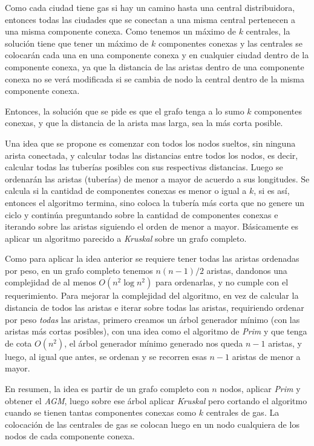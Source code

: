 Como cada ciudad tiene gas si hay un camino hasta una central distribuidora, entonces todas las ciudades que se conectan
a una misma central pertenecen a una misma componente conexa. Como tenemos un m\'aximo de $k$ centrales, la soluci\'on tiene que tener un m\'aximo de $k$ componentes conexas y las centrales se colocar\'an cada una en una componente conexa y en cualquier ciudad dentro de la componente conexa, ya que la distancia de las aristas dentro de una componente conexa no se ver\'a modificada si se cambia de nodo la central dentro de la misma componente conexa.

Entonces, la soluci\'on que se pide es que el grafo tenga a lo sumo $k$ componentes conexas, y que la distancia de la arista mas larga, sea la m\'as corta posible.

Una idea que se propone es comenzar con todos los nodos sueltos, sin ninguna arista conectada,
y calcular todas las distancias entre todos los nodos, es decir, calcular todas las tuber\'ias posibles con sus respectivas distancias.
Luego se ordenar\'an las aristas (tuber\'ias) de menor a mayor de acuerdo a sus longitudes.
Se calcula si la cantidad de componentes conexas es menor o igual a $k$, si es as\'i, entonces el algoritmo termina, sino coloca la tuber\'ia m\'as corta que no genere un ciclo y contin\'ua preguntando sobre la cantidad de componentes conexas e iterando sobre las aristas siguiendo el orden de menor a mayor.
B\'asicamente es aplicar un algoritmo parecido a \emph{Kruskal} sobre un grafo completo.

Como para aplicar la idea anterior se requiere tener todas las aristas ordenadas por peso, en un grafo completo tenemos $n(n-1)/2$ aristas, dandonos una complejidad de al menos $O(n^2 \log n^2)$ para ordenarlas, y no cumple con el requerimiento.
Para mejorar la complejidad del algoritmo, en vez de calcular la distancia de todos las aristas e iterar sobre todas las aristas, requiriendo ordenar por peso \emph{todas} las aristas, primero creamos un \'arbol generador m\'inimo (con las aristas m\'as cortas posibles), con una idea como el algoritmo de \emph{Prim} y que tenga de cota $O(n^2)$,
el \'arbol generador m\'inimo generado nos queda $n - 1$ aristas, y luego, al igual que antes, se ordenan y se recorren esas $n - 1$ aristas de menor a mayor.

En resumen, la idea es partir de un grafo completo con $n$ nodos, aplicar \emph{Prim} y obtener el \emph{AGM}, luego sobre ese \'arbol aplicar \emph{Kruskal} pero cortando el algoritmo cuando se tienen tantas componentes conexas como $k$ centrales de gas. La colocaci\'on de las centrales de gas se colocan luego en un nodo cualquiera de los nodos de cada componente conexa.

